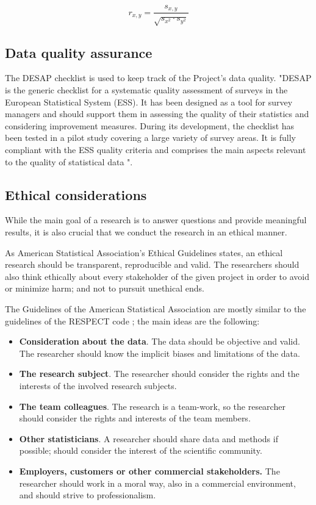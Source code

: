 \documentclass[12pt,a4paper,paper=a4,oneside,titlepage,pdftex]{scrartcl}
\begin{document}
\begin{equation}
r_{x,y} = \frac{s_{x,y}}{\sqrt{s_{x^2} \cdot s_{y^2}}}
\label{eq:correlation}
\end{equation}

\subsection{Data quality assurance}
The DESAP checklist is used to keep track of the Project's data quality. "DESAP  is  the  generic  checklist  for  a  systematic  quality  assessment  of  surveys  in  the  European Statistical  System  (ESS).  It  has  been  designed  as  a  tool  for  survey  managers  and  should  support them  in  assessing  the  quality  of  their  statistics  and  considering  improvement  measures.  During  its development, the checklist has been tested in a pilot study covering a large variety of survey areas. It is fully compliant with the ESS quality criteria and comprises the main aspects relevant to the quality of  statistical  data \citep{desap2019}".

\subsection{Ethical considerations} 
While the main goal of a research is to answer questions and provide meaningful results, it is also crucial that we conduct the research in an ethical manner. 

As American Statistical Association’s Ethical Guidelines \citep{asa} states, an ethical research should be transparent, reproducible and valid. The researchers should also think ethically about every stakeholder of the given project in order to avoid or minimize harm; and not to pursuit unethical ends. 

The Guidelines of the American Statistical Association are mostly similar to the guidelines of the RESPECT code \citep{respect}; the main ideas are the following:

\begin{itemize}
	\item \textbf{Consideration about the data}. The data should be objective and valid. The researcher should know the implicit biases and limitations of the data.
	\item \textbf{The research subject}. The researcher should consider the rights and the interests of the involved research subjects.
	\item \textbf{The team colleagues}. The research is a team-work, so the researcher should consider the rights and interests of the team members.
	\item \textbf{Other statisticians}. A researcher should share data and methods if possible; should consider the interest of the scientific community.
	\item \textbf{Employers, customers or other commercial stakeholders.} The researcher should work in a moral way, also in a commercial environment, and should strive to professionalism.
\end{itemize}
\end{document}
